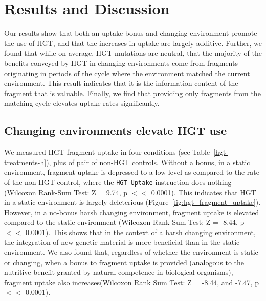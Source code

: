 \documentclass[PhD]{msu-thesis}
\begin{document}
\section{Results and Discussion}
Our results show that both an uptake bonus and changing environment promote the use of HGT, and that the increases in uptake are largely additive. Further, we found that while on average, HGT mutations are neutral, that the majority of the benefits conveyed by HGT in changing environments come from fragments originating in periods of the cycle where the environment matched the current environment. This result indicates that it is the information content of the fragment that is valuable. Finally, we find that providing only fragments from the matching cycle elevates uptake rates significantly.

\subsection{Changing environments elevate HGT use}

We measured HGT fragment uptake in four conditions (see Table~\ref{hgt-treatments-h}), plus of pair of non-HGT controls. Without a bonus, in a static environment, fragment uptake is depressed to a low level as compared to the rate of the non-HGT control, where the \texttt{HGT-Uptake} instruction does nothing (Wilcoxon Rank-Sum Test: Z = 9.74, p $<<$ 0.0001). This indicates that HGT in a static environment is largely deleterious (Figure~\ref{fig:hgt_fragment_uptake}). However, in a no-bonus harsh changing environment, fragment uptake is elevated compared to the static environment (Wilcoxon Rank Sum-Test: Z = -8.44, p $<<$ 0.0001). This shows that in the context of a harsh changing environment, the integration of new genetic material is more beneficial than in the static environment. We also found that, regardless of whether the environment is static or changing, when a bonus to fragment uptake is provided (analogous to the nutritive benefit granted by natural competence in biological organisms), fragment uptake also increases(Wilcoxon Rank Sum Test: Z = -8.44, and -7.47, p $<<$ 0.0001). 
\end{document}
